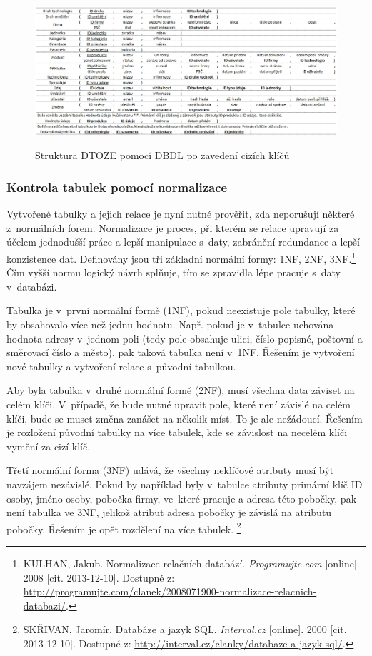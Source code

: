 \documentclass[11pt,a4paper]{article}
\begin{document}
\begin{figure}[H] 
\centering 
\caption{Struktura DTOZE pomocí DBDL po zavedení cizích klíčů} 
\includegraphics[scale=0.43]{DTOZE_log_B} 
\label{fig:DTOZE_log_B}
\end{figure} 
\newpage

\subsubsection{Kontrola tabulek pomocí normalizace}
Vytvořené tabulky a jejich relace je nyní nutné prověřit, zda neporušují některé z~normálních forem.  Normalizace je proces, při kterém se relace upravují za účelem jednodušší práce a lepší manipulace s~daty, zabránění redundance a lepší konzistence dat.  Definovány jsou tři základní normální formy: 1NF, 2NF, 3NF.\footnote{KULHAN, Jakub. Normalizace relačních databází. \textit{Programujte.com} [online]. 2008 [cit. 2013-12-10]. Dostupné z: \url{http://programujte.com/clanek/2008071900-normalizace-relacnich-databazi/}.} Čím vyšší normu logický návrh splňuje, tím se zpravidla lépe pracuje s~daty v~databázi.  

Tabulka je v~první normální formě (1NF), pokud neexistuje pole tabulky, které by obsahovalo více než jednu hodnotu. Např. pokud je v~tabulce uchována hodnota adresy v~jednom poli (tedy pole obsahuje ulici, číslo popisné, poštovní a směrovací číslo a město), pak taková tabulka není v~1NF. Řešením je vytvoření nové tabulky a vytvoření relace s~původní tabulkou. 

Aby byla tabulka v~druhé normální formě (2NF), musí všechna data záviset na celém klíči. V~případě, že bude nutné upravit pole, které není závislé na celém klíči, bude se muset změna zanášet na několik míst. To je ale nežádoucí. Řešením je rozložení původní tabulky na více tabulek, kde se závislost na necelém klíči vymění za cizí klíč. 

Třetí normální forma (3NF) udává, že všechny neklíčové atributy musí být navzájem nezávislé. Pokud by například byly v~tabulce atributy primární klíč ID osoby, jméno osoby, pobočka firmy, ve~které pracuje a adresa této pobočky, pak není tabulka ve 3NF, jelikož atribut adresa pobočky je závislá na atributu pobočky. Řešením je opět rozdělení na více tabulek. \footnote{SKŘIVAN, Jaromír. Databáze a jazyk SQL.  \textit{Interval.cz} [online]. 2000 [cit. 2013-12-10]. Dostupné z: \url{http://interval.cz/clanky/databaze-a-jazyk-sql/}.} 
\end{document}
